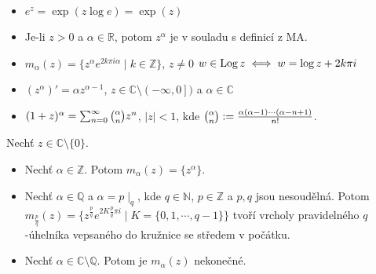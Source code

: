 \begin{properties}
\mbox{}
\vspace{-2em}
\begin{itemize}
    \item $e^z=\exp(z \log e)=\exp(z)$ 
    \item Je-li $z>0$ a $\alpha\in\mathbb{R}$, potom $z^{\alpha}$ je v souladu s definicí z MA.
    \item $m_{\alpha}(z)=\{z^{\alpha}e^{2k\pi i \alpha}\mid k\in\mathbb{Z}\}$, $z\neq 0$
    \newline
    $w\in \operatorname*{Log} z\iff w=\log z +2k\pi i$
    \item $(z^{\alpha})'=\alpha z^{\alpha-1}$, $z\in\mathbb{C}\setminus\left (-\infty,0\right ])$ a $\alpha\in\mathbb{C}$
    \item $(1+z)^{\alpha}=\sum_{n=0}^{\infty}\tbinom{\alpha}{n}z^{n} $, $\lvert z \rvert<1$, kde $\tbinom{\alpha}{n}:=\frac{\alpha(\alpha-1)\cdots(\alpha-n+1)}{n!}$.%
\end{itemize}
\end{properties}

\begin{observation}
Nechť $z \in\mathbb{C}\setminus\{0\}$.
\begin{itemize}
    \item Nechť $\alpha\in\mathbb{Z}$. Potom $m_{\alpha}(z)=\{z^{\alpha}\}$.%
    \item Nechť $\alpha\in\mathbb{Q}$ a $\alpha=p\mid_q$, kde $q\in\mathbb{N}$, $p\in\mathbb{Z}$ a $p,q$ jsou nesoudělná. Potom $m_{\frac{p}{q}}(z)=\{z^{\frac{p}{q}}e^{2K\frac{p}{q}\pi i}\mid K=\{0,1,\cdots,q-1\}\}$
    tvoří vrcholy pravidelného $q$-úhelníka vepsaného do kružnice se středem v počátku. %
    \item Nechť $\alpha\in\mathbb{C}\setminus\mathbb{Q}$. Potom je $m_{\alpha}(z)$ nekonečné.%
\end{itemize}
\end{observation}


